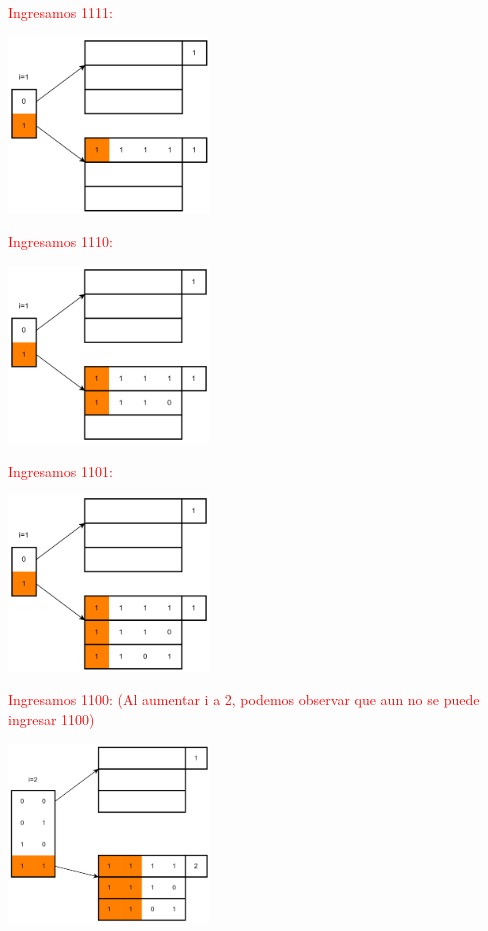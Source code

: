 \documentclass{templateNote}
\begin{document}
\begin{itemize}
\begin{enumerate}
        \textcolor{red}{
            Ingresamos 1111:
            \begin{center}
                \includegraphics[width=0.4\textwidth]{diagram/Problema2-21.png}
            \end{center}
            Ingresamos 1110:
            \begin{center}
                \includegraphics[width=0.4\textwidth]{diagram/Problema2-22.png}
            \end{center}
            Ingresamos 1101:
            \begin{center}
                \includegraphics[width=0.4\textwidth]{diagram/Problema2-23.png}
            \end{center}
            \newpage
            Ingresamos 1100: (Al aumentar i a 2, podemos observar que aun no se puede ingresar 1100)
            \begin{center}
                \includegraphics[width=0.4\textwidth]{diagram/Problema2-241.png}

\end{center}}
\end{enumerate}
\end{itemize}
\end{document}
